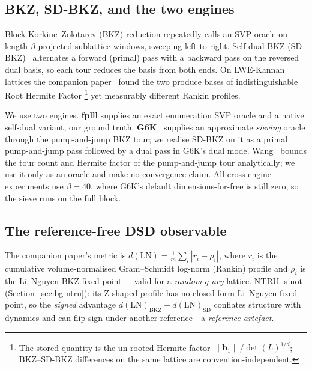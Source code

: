 \documentclass[journal=cic,version=preprint]{iacrj}
\begin{document}
\subsection{BKZ, SD-BKZ, and the two engines}
\label{sec:bg-bkz}
Block Korkine--Zolotarev (BKZ) reduction repeatedly calls an SVP oracle on
length-$\beta$ projected sublattice windows, sweeping left to right. Self-dual
BKZ (SD-BKZ)~\cite{EC:MicWal16} alternates a forward (primal) pass with a
backward pass on the reversed dual basis, so each tour reduces the basis from
both ends. On LWE-Kannan lattices the companion paper~\cite{Paper1} found the
two produce bases of indistinguishable Root Hermite Factor%
\footnote{The stored quantity is the un-rooted Hermite factor
$\|\mathbf b_1\|/\det(L)^{1/d}$; BKZ--SD-BKZ differences on the same lattice
are convention-independent.} yet measurably different Rankin profiles.

We use two engines. \textbf{fplll} supplies an exact enumeration SVP oracle
and a native self-dual variant, our ground truth. \textbf{G6K}~\cite{G6K2019}
supplies an approximate \emph{sieving} oracle through the pump-and-jump BKZ
tour; we realise SD-BKZ on it as a primal pump-and-jump pass followed by a
dual pass in G6K's dual mode.
Wang~\cite{Wang2024} bounds the tour count and Hermite factor of the
pump-and-jump tour analytically; we use it only as an oracle and make no
convergence claim. All cross-engine experiments use $\beta=40$, where G6K's
default dimensions-for-free is still zero, so the sieve runs on the full
block.

\subsection{The reference-free DSD observable}
\label{sec:bg-obs}
The companion paper's metric is $d(\mathrm{LN})=\frac1m\sum_i|r_i-\rho_i|$,
where $r_i$ is the cumulative volume-normalised Gram--Schmidt log-norm (Rankin) profile and $\rho_i$ is
the Li--Nguyen BKZ fixed point~\cite{EPRINT:LiNgu20}---valid for a
\emph{random $q$-ary} lattice. NTRU is not (Section~\ref{sec:bg-ntru}): its
Z-shaped profile has no closed-form Li--Nguyen fixed point, so the
\emph{signed} advantage
$d(\mathrm{LN})_{\mathrm{BKZ}}-d(\mathrm{LN})_{\mathrm{SD}}$ conflates
structure with dynamics and can flip sign under another reference---a
\emph{reference artefact}.
\end{document}
